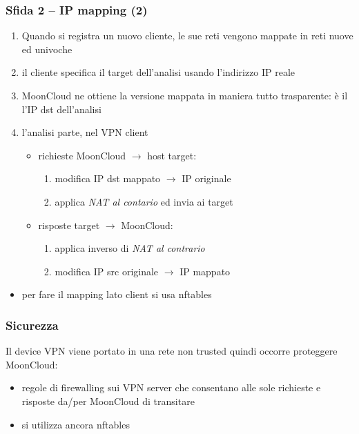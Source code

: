 \begin{frame}
	\frametitle{Sfida 2 -- IP mapping (2)}
	\begin{enumerate}
		\item Quando si registra un nuovo cliente, le sue reti vengono \alert{mappate}
		      in reti nuove ed univoche
		      
		\item il cliente specifica il target dell'analisi usando l'indirizzo IP reale
		              
		\item MoonCloud ne ottiene la \alert{versione mappata} in maniera tutto
		      \alert{trasparente}: è il l'IP dst dell'analisi
		      
		\item l'analisi parte, nel \alert{VPN client}
		      \begin{itemize}
		      	\item richieste MoonCloud $\rightarrow$ host target:
		      	      \begin{enumerate}
		      	      	\item modifica IP dst mappato $\rightarrow$ IP originale
		      	      	\item applica \textit{NAT al contario} ed invia ai target
		      	      \end{enumerate}
		      	\item risposte target $\rightarrow$ MoonCloud:
		      	      \begin{enumerate}
		      	      	\item applica inverso di \textit{NAT al contrario}
		      	      	\item modifica IP src originale $\rightarrow$ IP mappato
		      	      \end{enumerate}
		      \end{itemize}
		      
	\end{enumerate}
	
	\begin{itemize}
		\item per fare il mapping lato client si usa \alert{nftables}
	\end{itemize}
\end{frame}

\begin{frame}
    \frametitle{Sicurezza}
    Il device VPN viene portato in una rete \alert{non trusted} quindi
    occorre \alert{proteggere MoonCloud}:
    \begin{itemize}
        \item \alert{regole di firewalling} sui VPN server che consentano
        alle \alert{sole richieste e risposte} da/per MoonCloud di transitare
    \end{itemize}

    \begin{itemize}
        \item si utilizza ancora \alert{nftables}
    \end{itemize}
\end{frame}

